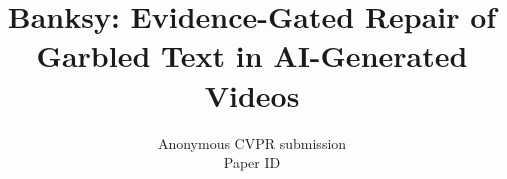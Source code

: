 \documentclass[10pt,twocolumn,letterpaper]{article}
\title{Banksy: Evidence-Gated Repair of Garbled Text in AI-Generated Videos}
\author{Anonymous CVPR submission\\
Paper ID \paperID}
\begin{document}
\maketitle









{
    \small
    
    
}


\end{document}

